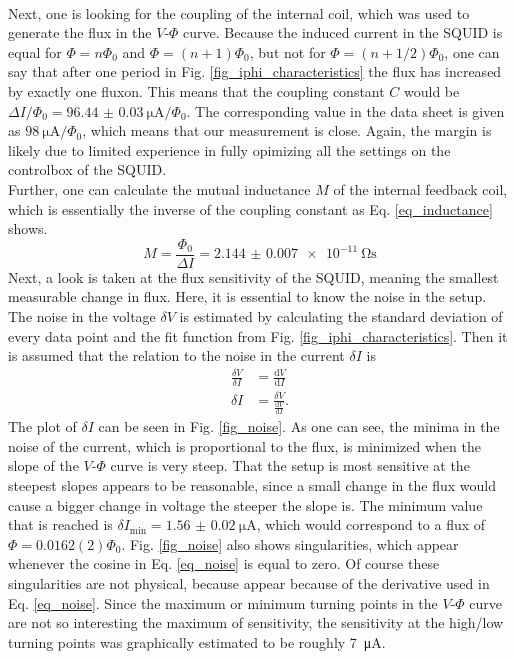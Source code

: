 \documentclass[a4paper,10pt]{article}
\newcommand{\dif}{\mathrm{d}}
\begin{document}
\\ %
Next, one is looking for the coupling of the internal coil, which was used to generate the flux in the $V$-$\Phi$ curve. Because the induced current in the SQUID is equal for $\Phi = n \Phi_0$ and $\Phi = (n + 1) \Phi_0$, but not for $\Phi = (n + 1/2) \Phi_0$, one can say that after one period in Fig. \ref{fig_iphi_characteristics} the flux has increased by exactly one fluxon. This means that the coupling constant $C$ would be $\Delta I / \Phi_0 = \SI{96.44(3)}{\micro \ampere} / \Phi_0$. The corresponding value in the data sheet \cite{datasheet} is given as $\SI{98}{\micro \ampere} / \Phi_0$, which means that our measurement is close. Again, the margin is likely due to limited experience in fully opimizing all the settings on the controlbox of the SQUID. 
\\
Further, one can calculate the mutual inductance $M$ of the internal feedback coil, which is essentially the inverse of the coupling constant as Eq. \ref{eq_inductance} shows. 
\begin{equation}
    \label{eq_inductance}
    M = \frac{\Phi_0}{\Delta I} = \SI{2.144(7)e-11}{\ohm \second}
\end{equation}
Next, a look is taken at the flux sensitivity of the SQUID, meaning the smallest measurable change in flux. Here, it is essential to know the noise in the setup. The noise in the voltage $\delta V$ is estimated by calculating the standard deviation of every data point and the fit function from Fig. \ref{fig_iphi_characteristics}. Then it is assumed that the relation to the noise in the current $\delta I$ is 
\begin{equation}
    \begin{split}
        \frac{\delta V}{\delta I} &= \frac{\dif V}{\dif I} \\
        \delta I &= \frac{\delta V}{\frac{\dif V}{\dif I}}. 
    \end{split}
\end{equation}
The plot of $\delta I$ can be seen in Fig. \ref{fig_noise}. As one can see, the minima in the noise of the current, which is proportional to the flux, is minimized when the slope of the $V$-$\Phi$ curve is very steep. That the setup is most sensitive at the steepest slopes appears to be reasonable, since a small change in the flux would cause a bigger change in voltage the steeper the slope is. The minimum value that is reached is $\delta I_\mathrm{min} = \SI{1.56(2)}{\micro \ampere}$, which would correspond to a flux of $\Phi = 0.0162(2) \Phi_0$. Fig. \ref{fig_noise} also shows singularities, which appear whenever the cosine in Eq. \ref{eq_noise} is equal to zero. Of course these singularities are not physical, because appear because of the derivative used in Eq. \ref{eq_noise}. Since the maximum or minimum turning points in the $V$-$\Phi$ curve are not so interesting the maximum of sensitivity, the sensitivity at the high/low turning points was graphically estimated to be roughly \SI{7}{\micro \ampere}. 
\end{document}
